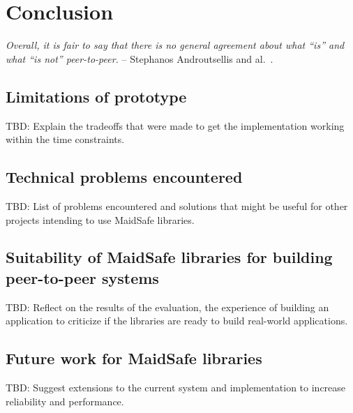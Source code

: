 \chapter{Conclusion}

\textit{Overall, it is fair to say that there is no general agreement about what “is” and what “is not” peer-to-peer.} -- Stephanos Androutsellis and al.~\cite{Androutsellis-Theotokis:2004}.

\section{Limitations of prototype}
TBD: Explain the tradeoffs that were made to get the implementation working within the time constraints.

\section{Technical problems encountered}

TBD: List of problems encountered and solutions that might be useful for other projects intending to use MaidSafe libraries.

\section{Suitability of MaidSafe libraries for building peer-to-peer systems}
TBD: Reflect on the results of the evaluation, the experience of building an application to criticize if the libraries are ready to build real-world applications.

\section{Future work for MaidSafe libraries}
TBD: Suggest extensions to the current system and implementation to increase reliability and performance.

